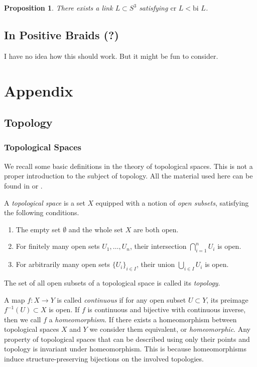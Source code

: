 \documentclass[a4paper]{article}
\newtheorem{proposition}[theorem]{Proposition}
\theoremstyle{definition}
\begin{document}
\begin{proposition}
There exists a link $L \subset S^3$ satisfying $\text{cr } L < \text{bi } L$.
\end{proposition}

\subsection{In Positive Braids (?)}
I have no idea how this should work. But it might be fun to consider.


\newpage
\appendix
\section{Appendix}
\subsection{Topology}
\subsubsection{Topological Spaces}
We recall some basic definitions in the theory of topological spaces.  This is not a proper introduction to the subject of topology. All the material used here can be found in \cite{lee2011} or \cite{munkres2000}. 

A \textit{topological space} is a set $X$ equipped with a notion of \textit{open subsets}, satisfying the following conditions.
\begin{enumerate}
\item The empty set $\emptyset$ and the whole set $X$ are both open.
\item For finitely many open sets $U_1, \dots, U_n$, their intersection $\bigcap_{i = 1}^n U_i$ is open.
\item For arbitrarily many open sets $\{U_i\}_{i \in I}$, their union $\bigcup_{i \in I} U_i$ is open.
\end{enumerate}
The set of all open subsets of a topological space is called its \textit{topology}.

A map $f: X \rightarrow Y$ is called \textit{continuous} if for any open subset $U \subset Y$, its preimage $f^{-1}(U) \subset X$ is open. If $f$ is continuous and bijective with continuous inverse, then we call $f$ a \textit{homeomorphism}. If there exists a homeomorphism between topological spaces $X$ and $Y$ we consider them equivalent, or \textit{homeomorphic}. Any property of topological spaces that can be described using only their points and topology is invariant under homeomorphism. This is because homeomorphisms induce structure-preserving bijections on the involved topologies.
\end{document}

